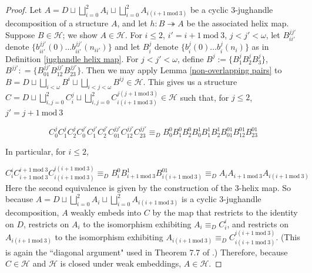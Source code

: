 \documentclass{amsart}
\theoremstyle{definition}
\theoremstyle{remark}
\numberwithin{equation}{section}
\begin{document}
\begin{proof}
    Let $A= D \sqcup \bigsqcup^{2}_{i = 0} A_{i} \sqcup \bigsqcup^{2}_{i = 0} A_{i(i+1\mathrm{\:mod\:} 3)}$ be a cyclic $3$-jughandle decomposition of a structure $A$, and let $h: B \twoheadrightarrow A$ be the associated helix map. Suppose $B \in \mathcal{H}$; we show $A \in \mathcal{H}$. For $i \leq 2$, $i' = i + 1 \mathrm{\: mod \:} 3$, $j < j' < \omega$, let $B^{jj'}_{ii'}$ denote $\{b^{jj'}_{ii'}(0)\ldots b^{jj'}_{ii'}(n_{ii'})\}$ and let $B^{j}_{i}$ denote $\{b^{j}_{i}(0)\ldots b^{j}_{i}(n_{i})\}$ as in Definition \ref{jughandle helix map}. For $j < j' < \omega$, define $B^{j} :=\{B^{j}_{1}B^{j}_{2}B^{j}_{3}\}$, $B^{jj'}: = \{B_{01}^{jj'}B^{jj'}_{12}B_{23}^{jj'}\}$.  Then we may apply Lemma \ref{non-overlapping pairs} to $B= D \sqcup \bigsqcup_{i < \omega} B^i \sqcup \bigsqcup_{i < j < \omega} B^{ij}  \in \mathcal{H}$. This gives us a structure $C= D \sqcup \bigsqcup^{2}_{i, j = 0} C_{i}^{j} \sqcup \bigsqcup^{2}_{i,j = 0} C^{j(j+1\mathrm{\:mod\:} 3)}_{i(i+1\mathrm{\:mod\:} 3)} \in \mathcal{H}$ such that, for $j \leq 2$, $j' = j+1 \mathrm{\: mod \:}3$


    $$C^{j}_{0}C^{j}_{1}C^{j}_{2}C^{j'}_{0}C^{j'}_{1}C^{j'}_{2}C_{01}^{jj'}C^{jj'}_{12}C_{23}^{jj'} \equiv_{D} B^{0}_{0}B^{0}_{1}B^{0}_{2}B^{1}_{0}B^{1}_{1}B^{1}_{2}B_{01}^{01}B^{01}_{12}B_{23}^{01}$$


In particular, for $i \leq 2$, 

 $$C^{i}_{i}C^{i + 1 \mathrm{\:mod\:}3}_{i + 1 \mathrm{\:mod\:}3} C^{i(i + 1 \mathrm{\:mod\:}3)}_{i(i + 1 \mathrm{\:mod\:}3)} \equiv_{D} B^{0}_{i}B^{1}_{i+1 \mathrm{\:mod \:} 3 }B^{01}_{i(i + 1 \mathrm{\:mod\:}3)}\equiv_{D} A_{i}A_{i + 1 \mathrm{\:mod\:}3}A_{i(i + 1 \mathrm{\:mod\:}3)}$$
Here the second equivalence is given by the construction of the $3$-helix map.  So because $A= D \sqcup \bigsqcup^{2}_{i = 0} A_{i} \sqcup \bigsqcup^{2}_{i = 0} A_{i(i+1\mathrm{\:mod\:} 3)}$ is a cyclic $3$-jughandle decomposition, $A$ weakly embeds into $C$ by the map that restricts to the identity on $D$, restricts on $A_i$ to the isomorphism exhibiting $A_{i}\equiv_{D} C^{i}_{i}$, and restricts on $A_{i(i+1\mathrm{\:mod\:} 3)}$ to the isomorphism exhibiting $A_{i(i+1\mathrm{\:mod\:} 3)} \equiv_{D} C^{i(i + 1 \mathrm{\:mod\:}3)}_{i(i + 1 \mathrm{\:mod\:}3)}$. (This is again the ``diagonal argument" used in Theorem 7.7 of \cite{Mal10b}.) Therefore, because $C \in \mathcal{H}$ and $\mathcal{H}$ is closed under weak embeddings, $A \in \mathcal{H}$.
    
\end{proof}
\end{document}
